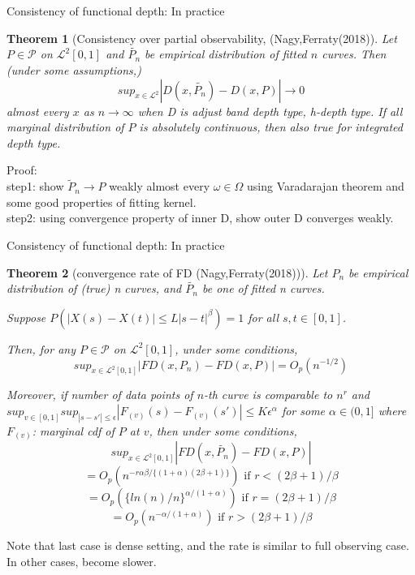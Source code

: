 \documentclass[aspectratio=169,ignorenonframetext,9pt]{beamer}
\theoremstyle{plain}
\newtheorem{thm}{Theorem}[section]
\theoremstyle{definition}
\begin{document}
\begin{frame}{Consistency of functional depth: In practice}
    \begin{thm}[Consistency over partial observability, (Nagy,Ferraty(2018)]
        Let $P\in\mathcal{P}$ on $\mathcal{L}^2[0,1]$ and $\tilde{P_n}$ be empirical distribution of fitted $n$ curves.
        Then (under some assumptions,)
        \[sup_{x\in\mathcal{L}^2} |D(x,\tilde{P_n})-D(x,P)|\rightarrow 0\]
        almost every $x$ as $n\rightarrow\infty$ when D is adjust band depth type, h-depth type.
        If all marginal distribution of $P$ is absolutely continuous, then also true for integrated depth type.
    \end{thm}
    Proof:  \\
    step1: show $\tilde{P}_n\rightarrow P$ weakly almost every $\omega\in\Omega$ using Varadarajan theorem and some good properties of fitting kernel. \\
    step2: using convergence property of inner D, show outer D converges weakly.

\end{frame}

\begin{frame}{Consistency of functional depth: In practice}
    \begin{thm}[convergence rate of FD (Nagy,Ferraty(2018))]
        Let $P_n$ be empirical distribution of (true) n curves, and $\tilde{P_n}$ be one of fitted n curves.

        Suppose $P(|X(s)-X(t)|\leq L|s-t|^\beta)=1$ for all $s,t \in [0,1]$.

        Then, for any $P\in\mathcal{P}$ on $\mathcal{L}^2[0,1]$, under some conditions,
        \[sup_{x\in\mathcal{L}^2[0,1]}|FD(x,P_n)-FD(x,P)|=O_p(n^{-1/2})\]
        
        Moreover, if number of data points of $n$-th curve is comparable to $n^r$ and 
        \(sup_{v\in[0,1]} sup_{|s-s'|\leq \epsilon} |F_{(v)}(s)-F_{(v)}(s')|\leq K\epsilon^\alpha\) for some $\alpha\in(0,1]$
        where $F_{(v)}$: marginal cdf of $P$ at $v$,
        then under some conditions,
        \[sup_{x\in\mathcal{L}^2[0,1]}|FD(x,\tilde{P_n})-FD(x,P)|\]
        \[=O_p(n^{-r\alpha\beta/\{(1+\alpha)(2\beta+1)\}}) \text{ if } r<(2\beta+1)/\beta\]
        \[=O_p(\{ln(n)/n\}^{\alpha/(1+\alpha)}) \text{ if } r=(2\beta+1)/\beta\]
        \[=O_p(n^{-\alpha/(1+\alpha)}) \text{ if } r>(2\beta+1)/\beta\]
    \end{thm}
    Note that last case is dense setting, and the rate is similar to full observing case.
    In other cases, become slower.

\end{frame}
\end{document}
